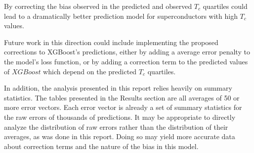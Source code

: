 \documentclass[oneside,12pt]{amsart}
\begin{document}
 By correcting the bias observed in the predicted and observed $T_c$ quartiles could lead to a dramatically better prediction model for superconductors with high $T_c$ values. 
 
 Future work in this direction could include implementing the proposed corrections to XGBoost's predictions, either by adding a average error penalty to the model's loss function, or by adding a correction term to the predicted values of $XGBoost$ which depend on the predicted $T_c$ quartiles.
 
 In addition, the analysis presented in this report relies heavily on summary statistics. The tables presented in the Results section are all averages of 50 or more error vectors. Each error vector is already a set of summary statistics for the raw errors of thousands of predictions. It may be appropriate to directly analyze the distribution of raw errors rather than the distribution of their averages, as was done in this report. Doing so may yield more accurate data about correction terms and the nature of the bias in this model.
 \newpage
\printbibliography
\end{document}
